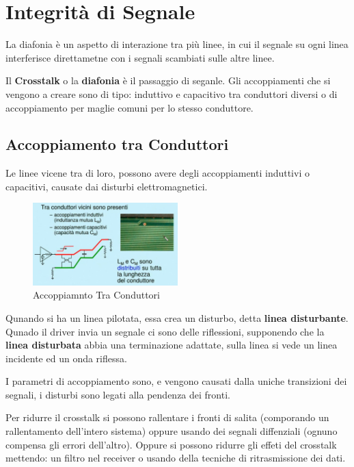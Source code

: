 \documentclass[12pt]{article}
\begin{document}
\section{Integrit\`a di Segnale}
La diafonia \`e un aspetto di interazione tra pi\`u linee, in cui il segnale su ogni linea interferisce direttametne con i segnali scambiati sulle altre linee.

Il \textbf{Crosstalk} o la \textbf{diafonia} \`e il passaggio di seganle. Gli accoppiamenti che si vengono a creare sono di tipo: induttivo e capacitivo tra conduttori diversi o di accoppiamento per maglie comuni per lo stesso conduttore.

\subsection{Accoppiamento tra Conduttori}
Le linee vicene tra di loro, possono avere degli accoppiamenti induttivi o capacitivi, causate dai disturbi elettromagnetici.
\begin{figure}[H]
    \centering
    \includegraphics[width=0.5\textwidth]{accoppiamnto-tra-conduttori.png}
    \caption{Accoppiamnto Tra Conduttori}
    \label{fig:accoppiamnto-tra-conduttori}
\end{figure}

Qunando si ha un linea pilotata, essa crea un disturbo, detta \textbf{linea disturbante}. Qunado il driver invia un segnale ci sono delle riflessioni, supponendo che la \textbf{linea disturbata} abbia una terminazione adattate, sulla linea si vede un linea incidente ed un onda riflessa.

I parametri di accoppiamento sono, e vengono causati dalla uniche transizioni dei segnali, i disturbi sono legati alla pendenza dei fronti. 

Per ridurre il crosstalk si possono rallentare i fronti di salita (comporando un rallentamento dell'intero sistema) oppure usando dei segnali diffenziali (ognuno compensa gli errori dell'altro). Oppure si possono ridurre gli effeti del crosstalk mettendo: un filtro nel receiver o usando della tecniche di ritrasmissione dei dati.
\end{document}
